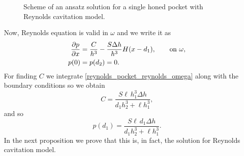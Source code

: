 \begin{figure}[hb]
 \centering 
 \def\svgwidth{\textwidth}
\caption{Scheme of an ansatz solution for a single honed pocket with Reynolds cavitation model.}\label{fig:pressure_pocket_ansatz_reynoldscav}
\end{figure}
Now, Reynolds equation is valid in $\omega$ and we write it as
\begin{align}
\parder{p}{x}&=\frac{C}{h^3}-\frac{S\Delta h}{h^3}H(x-d_1),\qquad\text{on }\omega,\label{eq:reynolds_pocket_reynolds_omega}\\
p(0)&=p(d_2)=0.\label{eq:reynolds_pocket_reynolds_omega_BC}
\end{align}
For finding $C$ we integrate \eqref{reynolds_pocket_reynolds_omega} along with the boundary conditions so we obtain
\begin{equation}
C=\frac{S\ell \,h_1^3\Delta h }{d_1h_2^3+\ell h_1^3},\label{eq:pocket_def_C}
\end{equation}
and so 
\begin{equation}
p(d_1)=\frac{S\ell \,d_1\Delta h }{d_1h_2^3+\ell h_1^3}.\label{eq:reynolds_pocket_reynolds_pd1}
\end{equation}
In the next proposition we prove that this is, in fact, the solution for Reynolds cavitation model.
